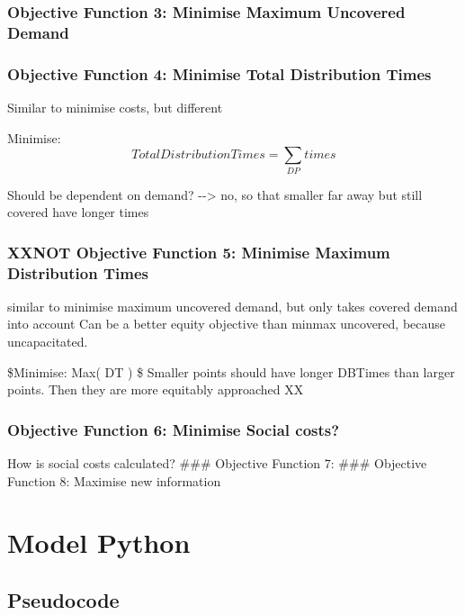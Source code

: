 \documentclass[11pt]{article}
\begin{document}
    \subsubsection{Objective Function 3: Minimise Maximum Uncovered
Demand}\label{objective-function-3-minimise-maximum-uncovered-demand}

\subsubsection{Objective Function 4: Minimise Total Distribution
Times}\label{objective-function-4-minimise-total-distribution-times}

Similar to minimise costs, but different

Minimise: \[ Total Distribution Times = \sum_{DP} times \]

Should be dependent on demand? -\/-\textgreater{} no, so that smaller
far away but still covered have longer times

\subsubsection{XXNOT Objective Function 5: Minimise Maximum Distribution
Times}\label{xxnot-objective-function-5-minimise-maximum-distribution-times}

similar to minimise maximum uncovered demand, but only takes covered
demand into account Can be a better equity objective than minmax
uncovered, because uncapacitated.

\$Minimise: Max( DT ) \$ Smaller points should have longer DBTimes than
larger points. Then they are more equitably approached XX

\subsubsection{Objective Function 6: Minimise Social
costs?}\label{objective-function-6-minimise-social-costs}

How is social costs calculated? \#\#\# Objective Function 7: \#\#\#
Objective Function 8: Maximise new information

    \section{Model Python}\label{model-python}

    \subsection{Pseudocode}\label{pseudocode}
\end{document}
